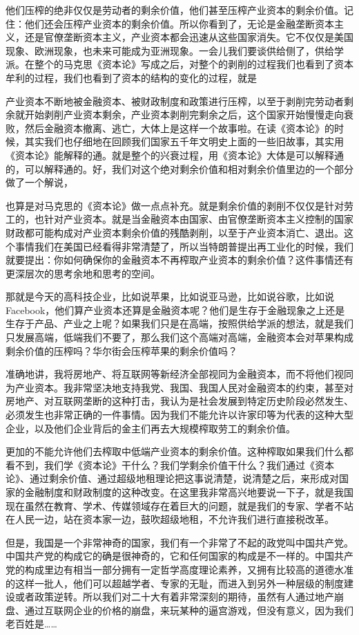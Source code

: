 \documentclass[UTF8, 12pt, a4paper]{ctexrep}
\begin{document}
他们压榨的绝非仅仅是劳动者的剩余价值，他们甚至压榨产业资本的剩余价值。记住：他们还会压榨产业资本的剩余价值。所以你看到了，无论是金融垄断资本主义，还是官僚垄断资本主义，产业资本都会迅速从这些国家消失。它不仅仅是美国现象、欧洲现象，也未来可能成为亚洲现象。一会儿我们要谈供给侧了，供给学派。在整个的马克思《资本论》写成之后，对整个的剥削的过程我们也看到了资本牟利的过程，我们也看到了资本的结构的变化的过程，就是

产业资本不断地被金融资本、被财政制度和政策进行压榨，以至于剥削完劳动者剩余就开始剥削产业资本剩余，产业资本剥削完剩余之后，这个国家开始慢慢走向衰败，然后金融资本撤离、逃亡，大体上是这样一个故事啦。在读《资本论》的时候，其实我们也仔细地在回顾我们国家五千年文明史上面的一些旧故事，其实用《资本论》能解释的通。就是整个的兴衰过程，用《资本论》大体是可以解释通的，可以解释通的。好，我们对这个绝对剩余价值和相对剩余价值里边的一个部分做了一个解说，

也算是对马克思的《资本论》做一点点补充。就是剩余价值的剥削不仅仅是针对劳工的，也针对产业资本。就是当金融资本由国家、由官僚垄断资本主义控制的国家财政都可能构成对产业资本剩余价值的残酷剥削，以至于产业资本消亡、退出。这个事情我们在美国已经看得非常清楚了，所以当特朗普提出再工业化的时候，我们就要提出：你如何确保你的金融资本不再榨取产业资本的剩余价值？这件事情还有更深层次的思考余地和思考的空间。

那就是今天的高科技企业，比如说苹果，比如说亚马逊，比如说谷歌，比如说Facebook，他们算产业资本还算是金融资本呢？他们是生存于金融现象之上还是生存于产品、产业之上呢？如果我们只是在高端，按照供给学派的想法，就是我们只发展高端，低端我们不要了，那么我们这个高端对高端，金融资本会对苹果构成剩余价值的压榨吗？华尔街会压榨苹果的剩余价值吗？

准确地讲，我将房地产、将互联网等新经济全部视同为金融资本，而不将他们视同为产业资本。我非常坚决地支持我党、我国、我国人民对金融资本的约束，甚至对房地产、对互联网垄断的这种打击，我认为是社会发展到特定历史阶段必然发生、必须发生也非常正确的一件事情。因为我们不能允许以许家印等为代表的这种大型企业，以及他们企业背后的金主们再去大规模榨取劳工的剩余价值。

更加的不能允许他们去榨取中低端产业资本的剩余价值。这种榨取如果我们什么都看不到，我们学《资本论》干什么？我们学剩余价值干什么？我们通过《资本论》、通过剩余价值、通过超级地租理论把这事说清楚，说清楚之后，来形成对国家的金融制度和财政制度的这种改变。在这里我非常高兴地要说一下子，就是我国现在虽然在教育、学术、传媒领域存在着巨大的问题，就是我们的专家、学者不站在人民一边，站在资本家一边，鼓吹超级地租，不允许我们进行直接税改革。

但是，我国是一个非常神奇的国家，我们有一个非常了不起的政党叫中国共产党。中国共产党的构成它的确是很神奇的，它和任何国家的构成是不一样的。中国共产党的构成里边有相当一部分拥有一定哲学高度理论素养，又拥有比较高的道德水准的这样一批人，他们可以超越学者、专家的无耻，而进入到另外一种层级的制度建设或者政策逆转。所以我们对二十大有着非常深刻的期待，虽然有人通过地产崩盘、通过互联网企业的价格的崩盘，来玩某种的逼宫游戏，但没有意义，因为我们老百姓是……
\end{document}
